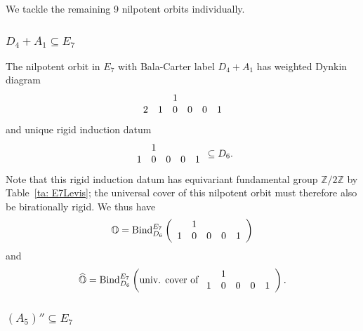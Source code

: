 \documentclass[11pt]{amsart}
\renewcommand{\O}{{\mathbb O}}
\newcommand{\bZ}{{\mathbb Z}}
\newcommand{\BInd}{{{\mbox{\rm Bind}}}}
\newcommand{\hatO}{\widehat{\O}}
\numberwithin{equation}{section}
\begin{document}
	We tackle the remaining 9 nilpotent orbits individually.
	
	\subsubsection{\texorpdfstring{$D_4+A_1\subseteq E_7$}{D4A1 in E7}}\label{sss: D4A1 in E7}
	
	The nilpotent orbit in $E_7$ with Bala-Carter label $D_4+A_1$ has weighted Dynkin diagram $$\begin{array}{c c c c c c}
		& & 1 & & & \\
		2 & 1 & 0 & 0 & 0 & 1 \\
	\end{array}$$ and unique rigid induction datum
	$$\begin{array}{c c c c c}
		& 1 & & & \\
		1 & 0 & 0 & 0 & 1 \\
	\end{array}\subseteq D_6.$$ 
	Note that this rigid induction datum has equivariant fundamental group $\bZ/2\bZ$ by Table~\ref{ta: E7Levis}; the universal cover of this nilpotent orbit must therefore also be birationally rigid. We thus have $$\O=\BInd_{D_6}^{E_7}\left( \begin{array}{c c c c c}
		& 1 & & & \\
		1 & 0 & 0 & 0 & 1 \\
	\end{array} \right)$$ and $$\hatO=\BInd_{D_6}^{E_7}\left( \mbox{univ. cover of }\begin{array}{c c c c c}
		& 1 & & & \\
		1 & 0 & 0 & 0 & 1 \\
	\end{array} \right).$$
	
	
	\subsubsection{\texorpdfstring{$(A_5)''\subseteq E_7$}{A5'' in E7}}\label{sss: A5'' in E7}
	
\end{document}
